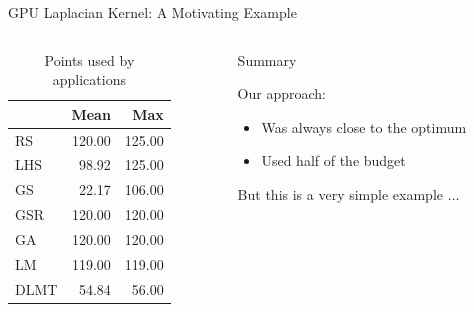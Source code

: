 \documentclass[10pt, compress, aspectratio=169, xcolor={table,usenames,dvipsnames}]{beamer}
\begin{document}
\begin{frame}[label={sec:orga9dcea1}]{GPU Laplacian Kernel: A Motivating Example}
\begin{columns}
\begin{column}{0.5\columnwidth}
\begin{table}[ht]
\centering
\begingroup\small
\begin{tabular}{lrr}
  \hline
  & Mean & Max \\
  \hline
  RS & 120.00 & 125.00 \\
  LHS & 98.92 & 125.00 \\
  GS & 22.17 & 106.00 \\
  GSR & 120.00 & 120.00 \\
  GA & 120.00 & 120.00 \\
  LM & 119.00 & 119.00 \\
  DLMT & 54.84 & 56.00 \\
    \hline
\end{tabular}
\endgroup
\caption{Points used by applications}
\end{table}
\end{column}

\begin{column}{0.5\columnwidth}
\begin{block}{Summary}
\vspace{.2cm}

Our approach:

\begin{itemize}
\item Was \alert{always close to the optimum}
\item Used \alert{half of the budget}
\end{itemize}

But this is a \alert{very simple example} \(\dots\)
\end{block}
\end{column}
\end{columns}
\end{frame}
\end{document}
